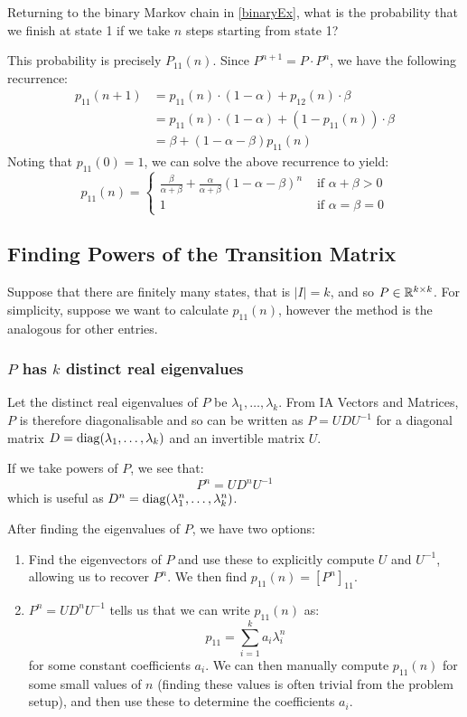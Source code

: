 \documentclass[../main.tex]{subfiles}
\begin{document}
\begin{example}
  Returning to the binary Markov chain in \cref{binaryEx}, what is the probability that we finish at state 1 if we take $n$ steps starting from state 1? \label{binaryProb}

  This probability is precisely $P_{1 1}(n)$.
  Since $P^{n + 1} = P \cdot P^n$, we have the following recurrence:
  \begin{align*}
    p_{1 1}(n + 1) &= p_{1 1}(n) \cdot (1 - \alpha) + p_{1 2}(n) \cdot \beta \\
                   &= p_{1 1}(n) \cdot (1 - \alpha) + (1 - p_{1 1}(n)) \cdot \beta \\
                   &= \beta + (1 - \alpha - \beta) p_{1 1}(n)
  \end{align*}
  Noting that $p_{1 1}(0) = 1$, we can solve the above recurrence to yield:
  \[
    p_{1 1}(n) = \begin{cases}
    \frac{\beta}{\alpha + \beta} + \frac{\alpha}{\alpha + \beta} (1 - \alpha - \beta)^{n} & \text{ if } \alpha + \beta > 0 \\
    1 & \text{ if } \alpha = \beta = 0
    \end{cases}
  \]
\end{example}
\subsection{Finding Powers of the Transition Matrix}
Suppose that there are finitely many states, that is $|I| = k$, and so $P \in \mathbb{R}^{k \times k}$.
For simplicity, suppose we want to calculate $p_{1 1}(n)$, however the method is the analogous for other entries.
\subsubsection{$P$ has $k$ distinct real eigenvalues}
Let the distinct real eigenvalues of $P$ be $\lambda_1, \ldots, \lambda_k$.
From IA Vectors and Matrices, $P$ is therefore diagonalisable and so can be written as $P = UDU^{-1}$ for a diagonal matrix $D = \operatorname{diag}(\lambda_1, \ldots, \lambda_k)$ and an invertible matrix $U$.

If we take powers of $P$, we see that:
\[
  P^{n} = U D^n U^{-1}
\]
which is useful as $D^n = \operatorname{diag}(\lambda^n_1, \ldots, \lambda^n_k)$.

After finding the eigenvalues of $P$, we have two options:
\begin{enumerate}
  \item Find the eigenvectors of $P$ and use these to explicitly compute $U$ and $U^{-1}$, allowing us to recover $P^n$.
    We then find $p_{1 1}(n) = [P^n]_{1 1}$.
  \item $P^n = UD^nU^{-1}$ tells us that we can write $p_{1 1}(n)$ as:
    \[
      p_{1 1} = \sum_{i = 1}^{k} a_i \lambda^n_i
    \]
    for some constant coefficients $a_i$.
    We can then manually compute $p_{1 1}(n)$ for some small values of $n$ (finding these values is often trivial from the problem setup), and then use these to determine the coefficients $a_i$.
\end{enumerate}
\end{document}
